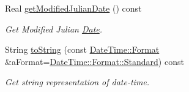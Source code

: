 \begin{DoxyCompactItemize}
Real \hyperlink{classostk_1_1physics_1_1time_1_1_date_time_a8f2ca8f9d2a8e1828c8f92827e1803ca}{get\+Modified\+Julian\+Date} () const
\begin{DoxyCompactList}\small\item\em Get Modified Julian \hyperlink{classostk_1_1physics_1_1time_1_1_date}{Date}. \end{DoxyCompactList}\item 
String \hyperlink{classostk_1_1physics_1_1time_1_1_date_time_a693b5b08de1352b5c6120290629bcb26}{to\+String} (const \hyperlink{classostk_1_1physics_1_1time_1_1_date_time_a1d21d982b18bf56ed684fcf1cd97e092}{Date\+Time\+::\+Format} \&a\+Format=\hyperlink{classostk_1_1physics_1_1time_1_1_date_time_a1d21d982b18bf56ed684fcf1cd97e092aeb6d8ae6f20283755b339c0dc273988b}{Date\+Time\+::\+Format\+::\+Standard}) const
\begin{DoxyCompactList}\small\item\em Get string representation of date-\/time. \end{DoxyCompactList}\end{DoxyCompactItemize}
